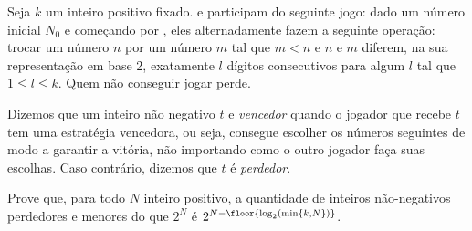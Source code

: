 Seja $k$ um inteiro positivo fixado.  e  participam do seguinte jogo:
dado um número inicial $N_0$ e começando por , eles alternadamente fazem a seguinte operação:
trocar um número $n$ por um número $m$ tal que $m < n$ e $n$ e $m$ diferem, na sua representação em base 2, exatamente $l$ dígitos consecutivos para algum $l$ tal que $1 \le l \le k$. Quem não conseguir jogar perde.

Dizemos que um inteiro não negativo $t$ e \textit{vencedor} quando o jogador que recebe $t$ tem uma estratégia vencedora, ou seja, consegue escolher os números seguintes de modo a garantir a vitória, não importando como o outro jogador faça suas escolhas. Caso contrário, dizemos que $t$ é \textit{perdedor}.

Prove que, para todo $N$ inteiro positivo, a quantidade de inteiros não-negativos perdedores e menores do que $2^N$ é $2^{N-\floor{\log_2(\mathrm{min}\{k, N\})}}$.
